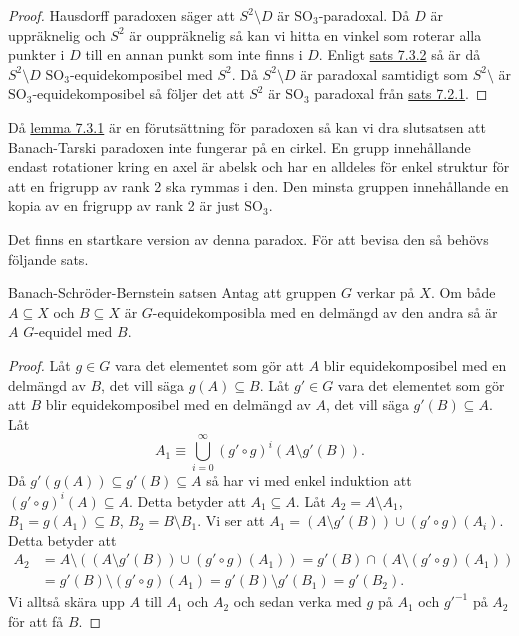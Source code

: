 \documentclass{article}
\theoremstyle{definition}
\begin{document}
\begin{proof}
  Hausdorff paradoxen säger att $S^2 \setminus D$ är $\text{SO}_3$-paradoxal. Då $D$ är uppräknelig och $S^2$ är ouppräknelig så kan vi 
  hitta en vinkel som roterar alla punkter i $D$ till en annan punkt som inte finns i $D$. Enligt \hyperlink{sats8.2.3}{sats 7.3.2} så är då 
  $S^2 \setminus D$ $\text{SO}_3$-equidekomposibel med $S^2$. Då $S^2 \setminus D$ är paradoxal samtidigt som $S^2 \setminus$ är $\text{SO}_3$-equidekomposibel 
  så följer det att $S^2$ är $\text{SO}_3$ paradoxal från \hyperlink{sats8.2.1}{sats 7.2.1}.
\end{proof}
Då \hyperlink{lemma8.3.1}{lemma 7.3.1} är en förutsättning för paradoxen så kan vi dra slutsatsen att Banach-Tarski paradoxen inte 
fungerar på en cirkel. En grupp innehållande endast rotationer kring en axel är abelsk och har en alldeles för enkel struktur 
för att en frigrupp av rank 2 ska rymmas i den. Den minsta gruppen innehållande en kopia av en frigrupp av rank 2 är just $\text{SO}_3$.

Det finns en startkare version av denna paradox. För att bevisa den så behövs följande sats.

\begin{mytheo}{Banach-Schröder-Bernstein satsen}{}
  Antag att gruppen $G$ verkar på $X$. Om både $A \subseteq X$ och $B \subseteq X$ är $G$-equidekomposibla med en delmängd av den andra så är $A$
  $G$-equidel med $B$.
\end{mytheo}
\begin{proof}
  Låt $g \in G$ vara det elementet som gör att $A$ blir equidekomposibel med en delmängd av $B$, det vill säga $g(A) \subseteq B$.
  Låt $g' \in G$ vara det elementet som gör att $B$ blir equidekomposibel med en delmängd av $A$, det vill säga $g'(B) \subseteq A$.
  Låt 
  \[A_1 \equiv \bigcup_{i = 0}^\infty (g' \circ g)^i(A \setminus g'(B)).\]
  Då $g'(g(A)) \subseteq g'(B) \subseteq A$ så har vi med enkel induktion att $(g' \circ g)^i(A) \subseteq A$. Detta betyder att $A_1 \subseteq A$.
  Låt $A_2 = A \setminus A_1$, $B_1 = g(A_1) \subseteq B$, $B_2 = B \setminus B_1$. Vi ser att $A_1 = (A \setminus g'(B)) \cup (g' \circ g)(A_i)$. 
  Detta betyder att
  \begin{align*}
    A_2 &= A \setminus ((A \setminus g'(B)) \cup (g' \circ g)(A_1)) = g'(B) \cap ( A \setminus (g' \circ g)(A_1) ) \\
    &= g'(B) \setminus (g' \circ g)(A_1) = g'(B) \setminus g'(B_1) = g'(B_2).
  \end{align*}
  Vi alltså skära upp $A$ till $A_1$ och $A_2$ och sedan verka med $g$ på $A_1$ och $g'^{-1}$ på $A_2$ för att få $B$. 
\end{proof}
\end{document}
